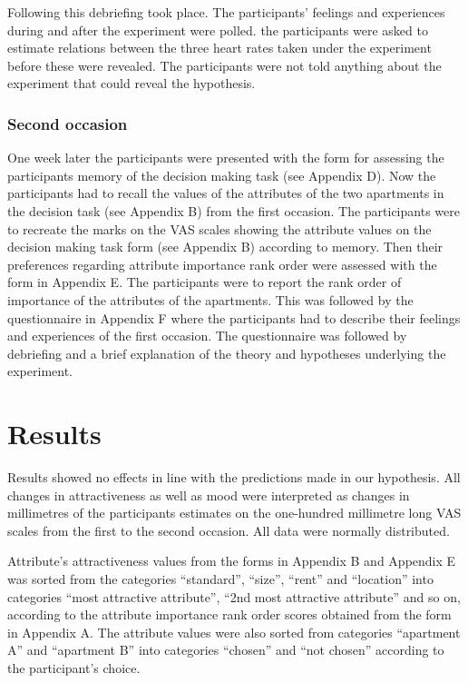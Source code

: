 Following this debriefing took place.  The participants' feelings and
experiences during and after the experiment were polled.  the
participants were asked to estimate relations between the three heart
rates taken under the experiment before these were revealed.  The
participants were not told anything about the experiment that could
reveal the hypothesis.


\subsubsection{Second occasion}

One week later the participants were presented with the form for
assessing the participants memory of the decision making task (see
Appendix D).  Now the participants had to recall the values of the
attributes of the two apartments in the decision task (see Appendix B)
from the first occasion.  The participants were to recreate the marks
on the VAS scales showing the attribute values on the decision making
task form (see Appendix B) according to memory.  Then their
preferences regarding attribute importance rank order were assessed
with the form in Appendix E. The participants were to report the rank
order of importance of the attributes of the apartments.  This was
followed by the questionnaire in Appendix F where the participants had
to describe their feelings and experiences of the first occasion.  The
questionnaire was followed by debriefing and a brief explanation of
the theory and hypotheses underlying the experiment.


\section{Results}


Results showed no effects in line with the predictions made in our hypothesis.
All changes in attractiveness as well as mood were interpreted as
changes in millimetres of the participants estimates on the
one-hundred millimetre long VAS scales from the first to the second
occasion.  All data were normally distributed.

Attribute's attractiveness values from the forms in Appendix B and
Appendix E was sorted from  the categories ``standard'', ``size'', ``rent''
and ``location'' into categories ``most attractive attribute'', ``2nd most
attractive attribute'' and so on, according to the attribute importance
rank order scores obtained from the form in Appendix A. The attribute
values were also sorted from categories ``apartment A'' and ``apartment
B'' into categories ``chosen'' and ``not chosen'' according to the
participant's choice.


